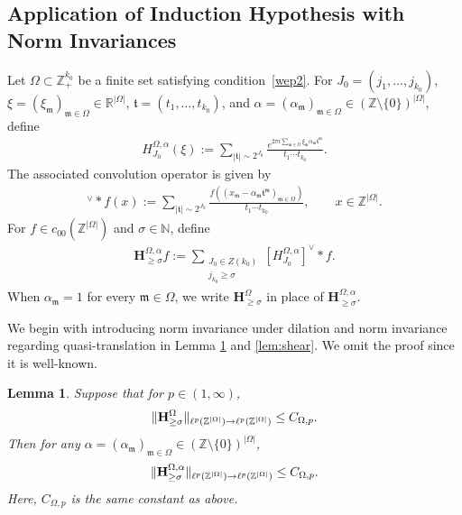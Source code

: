 \documentclass[10pt,a4paper]{amsart}
\newtheorem{lemma}{Lemma}\numberwithin{lemma}{section}
\numberwithin{equation}{section}
\begin{document}
\subsection{Application of Induction Hypothesis with Norm Invariances}
Let $\Omega \subset \mathbb{Z}_+^{k_0}$ be a finite set satisfying condition~\eqref{wep2}. 
For $J_0=(j_1,\ldots,j_{k_0})$, 
$\xi=(\xi_{\mathfrak{m}})_{\mathfrak{m}\in\Omega}\in\mathbb{R}^{|\Omega|}$,
$\mathfrak{t}=(t_1,\ldots,t_{k_0})$, and
$\alpha=(\alpha_{\mathfrak{m}})_{\mathfrak{m}\in\Omega}
\in(\mathbb{Z}\setminus\{0\})^{|\Omega|}$, define
\begin{align*}
	H_{J_0}^{\Omega,\alpha}(\xi)
	:=
	\sum_{|\mathfrak{t}|\sim 2^{J_0}}
	\frac{
		e^{2\pi i\sum_{\mathfrak{m}\in\Omega}
			\xi_{\mathfrak{m}}\alpha_{\mathfrak{m}}\mathfrak{t}^{\mathfrak{m}}}
	}{
		t_1\cdots t_{k_0}
	}.
\end{align*}
The associated convolution operator is given by
\begin{align*}
	[H_{J_0}^{\Omega,\alpha}]^\vee*f(x)
	:=
	\sum_{|\mathfrak{t}|\sim 2^{J_0}}
	\frac{
		f\!\left(
		(x_{\mathfrak{m}}
		-\alpha_{\mathfrak{m}}\mathfrak{t}^{\mathfrak{m}})
		_{\mathfrak{m}\in\Omega}
		\right)
	}{
		t_1\cdots t_{k_0}
	},
	\qquad x\in\mathbb{Z}^{|\Omega|}.
\end{align*}
 For $f\in c_{00}(\mathbb{Z}^{|\Omega|})$ and $\sigma\in\mathbb{N}$, define
\begin{align}\label{42cc}
	\mathbf{H}_{\geq \sigma}^{\Omega,\alpha}f
	:=
	\sum_{\substack{J_0\in Z(k_0)\\ j_{k_0}\geq \sigma}}
	[H_{J_0}^{\Omega,\alpha}]^\vee*f.
\end{align}
When $\alpha_{\mathfrak{m}}=1$ for every $\mathfrak{m}\in\Omega$, we write
$\mathbf{H}_{\geq \sigma}^{\Omega}$ in place of
$\mathbf{H}_{\geq \sigma}^{\Omega,\alpha}$.




We begin with introducing norm invariance under dilation and norm invariance regarding quasi-translation in Lemma \ref{c1} and \ref{lem:shear}. We omit the proof since it is well-known.

 
 
 \begin{lemma}\label{c1}
Suppose that for $p \in (1,\infty)$,
\[
\| {\bf H}_{\ge \sigma}^{\Omega} \|_{\ell^p(\mathbb{Z}^{|\Omega|}) \to \ell^p(\mathbb{Z}^{|\Omega|})}
\le C_{\Omega,p}.
\]
Then for any $\alpha=(\alpha_{\mathfrak m})_{\mathfrak m\in\Omega}\in (\mathbb{Z}\setminus\{0\})^{|\Omega|}$, 
\begin{align}\label{ind1}
\| {\bf H}_{\ge \sigma}^{\Omega,\alpha} \|_{\ell^p(\mathbb{Z}^{|\Omega|}) \to \ell^p(\mathbb{Z}^{|\Omega|})}
\le C_{\Omega,p}.
\end{align}
Here, $C_{\Omega,p}$ is the same constant as above.
\end{lemma}
\end{document}
